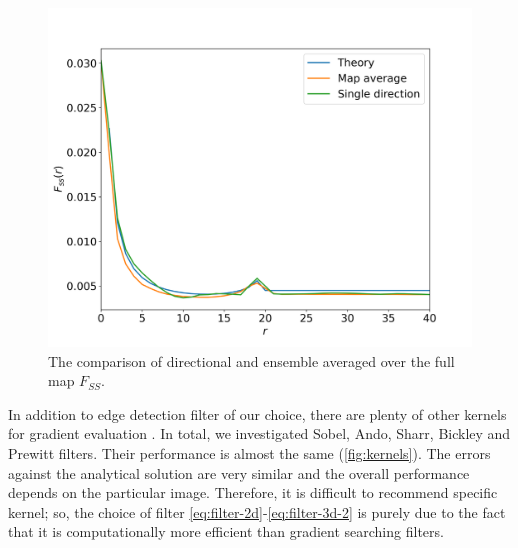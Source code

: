 \documentclass[reprint,amsmath,amssymb,aps,pre,showkeys,showpacs]{revtex4-1}
\begin{document}
\begin{figure}[ht]
  \centering
  \includegraphics[width=\linewidth]{images/direction_and_map.png}
  \caption{The comparison of directional and ensemble averaged over the full map
    $F_{SS}$.}
  \label{fig:direction-vs-map}
\end{figure}

In addition to edge detection filter of our choice, there are plenty of other
kernels for gradient evaluation \cite{bickley1948,prewitt1970,ando2000}. In
total, we investigated Sobel, Ando, Sharr, Bickley and Prewitt filters. Their
performance is almost the same (\cref{fig:kernels}). The errors against the
analytical solution are very similar and the overall performance depends on the
particular image. Therefore, it is difficult to recommend specific kernel; so,
the choice of filter \cref{eq:filter-2d}-\cref{eq:filter-3d-2} is purely due to
the fact that it is computationally more efficient than gradient searching
filters.
\end{document}
